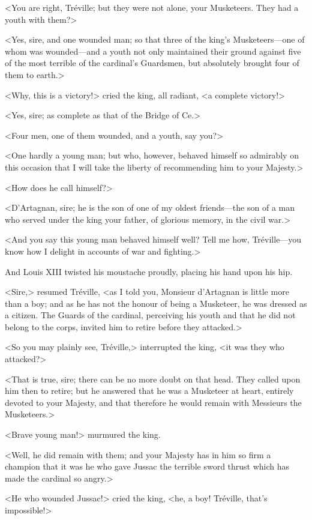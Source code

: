 <You are right, Tréville; but they were not alone, your Musketeers. They had a youth with them?> 

<Yes, sire, and one wounded man; so that three of the king's Musketeers---one of whom was wounded---and a youth not only maintained their ground against five of the most terrible of the cardinal's Guardsmen, but absolutely brought four of them to earth.> 

<Why, this is a victory!> cried the king, all radiant, <a complete victory!> 

<Yes, sire; as complete as that of the Bridge of Ce.> 

<Four men, one of them wounded, and a youth, say you?> 

<One hardly a young man; but who, however, behaved himself so admirably on this occasion that I will take the liberty of recommending him to your Majesty.> 

<How does he call himself?> 

<D'Artagnan, sire; he is the son of one of my oldest friends---the son of a man who served under the king your father, of glorious memory, in the civil war.> 

<And you say this young man behaved himself well? Tell me how, Tréville---you know how I delight in accounts of war and fighting.> 

And Louis XIII twisted his moustache proudly, placing his hand upon his hip. 

<Sire,> resumed Tréville, <as I told you, Monsieur d'Artagnan is little more than a boy; and as he has not the honour of being a Musketeer, he was dressed as a citizen. The Guards of the cardinal, perceiving his youth and that he did not belong to the corps, invited him to retire before they attacked.> 

<So you may plainly see, Tréville,> interrupted the king, <it was they who attacked?> 

<That is true, sire; there can be no more doubt on that head. They called upon him then to retire; but he answered that he was a Musketeer at heart, entirely devoted to your Majesty, and that therefore he would remain with Messieurs the Musketeers.> 

<Brave young man!> murmured the king. 

<Well, he did remain with them; and your Majesty has in him so firm a champion that it was he who gave Jussac the terrible sword thrust which has made the cardinal so angry.> 

<He who wounded Jussac!> cried the king, <he, a boy! Tréville, that's impossible!> 

